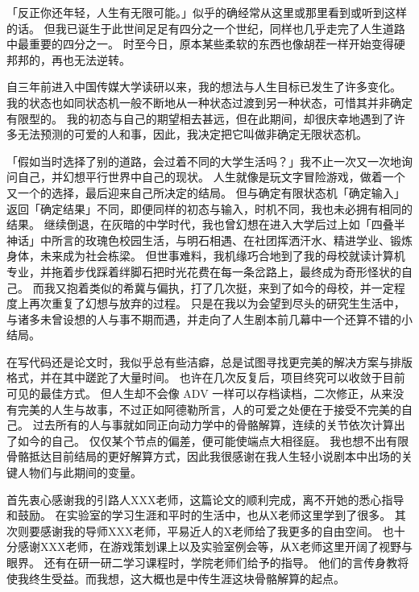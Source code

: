 

\begin{acknowledgements}
「反正你还年轻，人生有无限可能。」似乎的确经常从这里或那里看到或听到这样的话。
但我已诞生于此世间足足有四分之一个世纪，同样也几乎走完了人生道路中最重要的四分之一。
时至今日，原本某些柔软的东西也像胡茬一样开始变得硬邦邦的，再也无法逆转。

自三年前进入中国传媒大学读研以来，我的想法与人生目标已发生了许多变化。
我的状态也如同状态机一般不断地从一种状态过渡到另一种状态，可惜其并非确定有限型的。
我的初态与自己的期望相去甚远，但在此期间，却很庆幸地遇到了许多无法预测的可爱的人和事，因此，我决定把它叫做非确定无限状态机。

「假如当时选择了别的道路，会过着不同的大学生活吗？」我不止一次又一次地询问自己，并幻想平行世界中自己的现状。
人生就像是玩文字冒险游戏，做着一个又一个的选择，最后迎来自己所决定的结局。
但与确定有限状态机「确定输入」返回「确定结果」不同，即便同样的初态与输入，时机不同，我也未必拥有相同的结果。
继续倒退，在灰暗的中学时代，我也曾幻想在进入大学后过上如「四叠半神话」中所言的玫瑰色校园生活，与明石相遇、在社团挥洒汗水、精进学业、锻炼身体，未来成为社会栋梁。
但世事难料，我机缘巧合地到了我的母校就读计算机专业，并拖着步伐踩着绊脚石把时光花费在每一条岔路上，最终成为奇形怪状的自己。
而我又抱着类似的希冀与偏执，打了几次挺，来到了如今的母校，并一定程度上再次重复了幻想与放弃的过程。
只是在我以为会望到尽头的研究生生活中，与诸多未曾设想的人与事不期而遇，并走向了人生剧本前几幕中一个还算不错的小结局。

在写代码还是论文时，我似乎总有些洁癖，总是试图寻找更完美的解决方案与排版格式，并在其中蹉跎了大量时间。
也许在几次反复后，项目终究可以收敛于目前可见的最佳方式。
但人生却不会像 ADV 一样可以存档读档，二次修正，从来没有完美的人生与故事，不过正如阿德勒所言，人的可爱之处便在于接受不完美的自己。
过去所有的人与事就如同正向动力学中的骨骼解算，连续的关节依次计算出了如今的自己。
仅仅某个节点的偏差，便可能使端点大相径庭。
我也想不出有限骨骼抵达目前结局的更好解算方式，因此我很感谢在我人生轻小说剧本中出场的关键人物们与此期间的变量。

首先衷心感谢我的引路人XXX老师，这篇论文的顺利完成，离不开她的悉心指导和鼓励。
在实验室的学习生涯和平时的生活中，也从X老师这里学到了很多。
其次则要感谢我的导师XXX老师，平易近人的X老师给了我更多的自由空间。
也十分感谢XXX老师，在游戏策划课上以及实验室例会等，从X老师这里开阔了视野与眼界。
还有在研一研二学习课程时，学院老师们给予的指导。
他们的言传身教将使我终生受益。而我想，这大概也是中传生涯这块骨骼解算的起点。


\end{acknowledgements}
